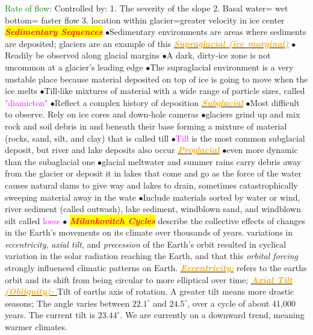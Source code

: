 \documentclass{article}
\newcommand{\ddd}{$\bullet$}
\newcommand{\red}[1]{\textcolor{red}{#1}}
\newcommand{\green}[1]{\textcolor{green}{#1}}
\newcommand{\pink}[1]{\textcolor{magenta}{#1}}
\newcommand{\orange}[1]{\textcolor{orange}{#1}}
\newcommand{\mysection}[1]{\colorbox{yellow}{{\textbf{\textbf{\textit{\red{#1}}}}}}}
\newcommand{\mysub}[1]{\underline{\textbf{{\textit{\orange{#1}}}}}}
\newcommand{\mysubsub}[1]{{{\green{#1}}}}
\newcommand{\vocab}[1]{{\pink{#1}}}
\begin{document}
\begin{multicols*}{4}
           	\mysubsub{Rate of flow: } Controlled by: 1. The severity of the slope 2. Basal water= wet bottom= faster flow 3. location within glacier=greater velocity in ice center
        \mysection{Sedimentary Sequences}
        \ddd Sedimentary environments are areas where sediments are deposited; glaciers are an example of this
        \mysub{Supraglacial (ice marginal)}
            \ddd Readily be observed along glacial margins
            \ddd A dark, dirty-ice zone is not uncommon at a glacier’s leading edge
            \ddd The supraglacial environment is a very unstable place because material deposited on top of ice is going to move when the ice melts
            \ddd Till-like mixtures of material with a wide range of particle sizes, called \vocab{"diamicton"}
            \ddd Reflect a complex history of deposition
        \mysub{Subglacial}
            \ddd Most difficult to observe. Rely on ice cores and down-hole cameras 
            \ddd glaciers grind up and mix rock and soil debris in and beneath their base forming a mixture of material (rocks, sand, silt, and clay) that is called till
            \ddd \vocab{Till} is the most common subglacial deposit, but river and lake deposits also occur 
        \mysub{Proglacial}
            \ddd even more dynamic than the subaglacial one
            \ddd glacial meltwater and summer rains carry debris away from the glacier or deposit it in lakes that come and go as the force of the water causes natural dams to give way and lakes to drain, sometimes catastrophically sweeping material away in the wate
            \ddd Include materials sorted by water or wind, river sediment (called outwash), lake sediment, windblown sand, and windblown silt called \vocab{loess} \ddd
        \mysection{Milankovitch Cycles}
         describe the collective effects of changes in the Earth's movements on its climate over thousands of years. variations in \textit{eccentricity}, \textit{axial tilt}, and \textit{precession} of the Earth's orbit resulted in cyclical variation in the solar radiation reaching the Earth, and that this \textit{orbital forcing} strongly influenced climatic patterns on Earth.
         \mysub{Eccentricity:} refers to the earths orbit and its shift from being circular to more elliptical over time;
        \mysub{Axial Tilt (Obliquity): }Tilt of earths axis of rotation. A greater tilt means more drastic seasons; The angle varies between $22.1^\circ$ and $24.5^\circ$, over a cycle of about 41,000 years. The current tilt is $23.44^\circ$. We are currently on a downward trend, meaning warmer climates.

\end{multicols*}
\end{document}
